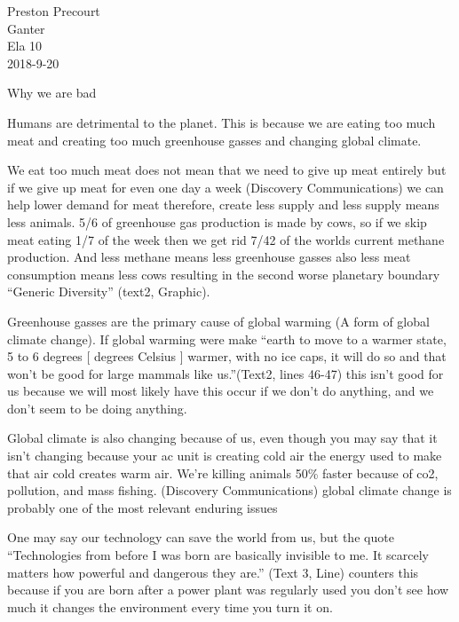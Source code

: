 \documentclass[12pt]{article}
\begin{document}
\begin{flushleft}

Preston Precourt\\
Ganter\\
Ela 10\\
2018-9-20\\
\end{flushleft}

\begin{center}
Why we are bad
\end{center}


\setlength{\parindent}{0.5in}

Humans are detrimental to the planet. This is because we are eating too much meat and creating too much greenhouse gasses and changing global climate.  

We eat too much meat does not mean that we need to give up meat entirely but if we give up meat for even one day a week (Discovery Communications) we can help lower demand for meat therefore, create less supply and less supply means less animals. 5/6 of greenhouse gas production is made by cows, so if we skip meat eating 1/7 of the week then we get rid 7/42 of the worlds current methane production. And less methane means less greenhouse gasses also less meat consumption means less cows resulting in the second worse planetary boundary “Generic Diversity” (text2, Graphic).  

Greenhouse gasses are the primary cause of global warming (A form of global climate change). If global warming were make “earth to move to a warmer state, 5 to 6 degrees [ degrees Celsius ] warmer, with no ice caps, it will do so and that won’t be good for large mammals like us.”(Text2, lines 46-47) this isn’t good for us because we will most likely have  this occur if we don’t  do anything, and we don’t seem to be doing anything. 

Global climate is also changing because of us, even though you may say that it isn’t changing because your ac unit is creating cold air the energy used to make that air cold creates warm air. We’re killing animals 50\% faster because of co2, pollution, and mass fishing. (Discovery Communications) global climate change is probably one of the most relevant enduring issues 

One may say our technology can save the world from us, but the quote “Technologies from before I was born are basically invisible to me. It scarcely matters how powerful and dangerous they are.” (Text 3, Line) counters this because if you are born after a power plant was regularly used you don’t see how much it changes the environment every time you turn it on. 
\end{document}
